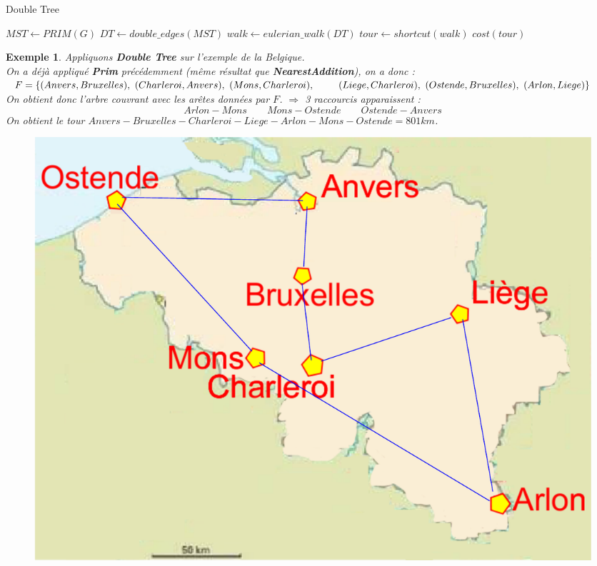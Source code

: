 \documentclass{article}
\newtheorem{exemple}{Exemple}[section]
\begin{document}
\begin{sffamily}
\begin{algorithm}[h!]
\caption{Double Tree}
\begin{algorithmic}[1]
\STATE $MST\leftarrow PRIM(G)$
\STATE $DT \leftarrow double\_edges(MST)$
\STATE $walk \leftarrow eulerian\_walk(DT)$
\STATE $tour \leftarrow shortcut(walk)$
\RETURN $cost(tour)$
\end{algorithmic}
\end{algorithm}

\begin{exemple} Appliquons \textbf{Double Tree} sur l'exemple de la Belgique. \\
On a déjà appliqué \textbf{Prim} précédemment (même résultat que \textbf{NearestAddition}), on a donc : \\
$	F = \{(Anvers,Bruxelles),\ (Charleroi, Anvers),\ (Mons, Charleroi),\ \\\indent\quad  (Liege, Charleroi),\ (Ostende, Bruxelles),\ (Arlon,
Liege)\} $ \\
On obtient donc l'arbre couvrant avec les arêtes données par $F$. $\Rightarrow$ 3 raccourcis apparaissent :
$$Arlon-Mons\qquad Mons-Ostende\qquad Ostende-Anvers$$
On obtient le tour $Anvers-Bruxelles-Charleroi-Liege-Arlon-Mons-Ostende = 801km$.
\begin{figure}[h!]
    \begin{center}
    \includegraphics[scale=0.28]{belgiqueDT.pdf}

\end{center}
\end{figure}
\end{exemple}
\end{sffamily}
\end{document}
